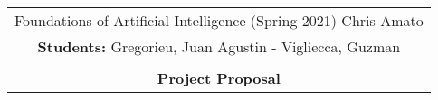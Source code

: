 \documentclass{article}
\begin{document}
\begin{center}
    \begin{tabular}{|c|}
        \hline
        Foundations of Artificial Intelligence (Spring 2021) \hspace{2cm} Chris Amato
         \\
        \textbf{Students:} Gregorieu, Juan Agustin - Vigliecca, Guzman \hfill \\\\
        {\bfseries \large  Project Proposal}\\ \hline 
    \end{tabular} 
\end{center}

\newcommand{\ignore}[2]{\hspace{0in}#2}


\begin{enumerate}
	

\end{enumerate}
\end{document}
